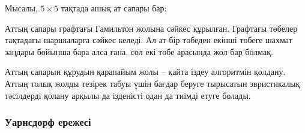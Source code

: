 Мысалы, $5 \times 5$ тақтада ашық ат сапары бар:

\begin{center}
\end{center}

Аттың сапары графтағы Гамильтон жолына сәйкес құрылған. Графтағы төбелер
тақтадағы шаршыларға сәйкес келеді. Ал ат бір төбеден екінші төбеге шахмат заңдары бойынша бара алса ғана, сол екі төбе арасында жол бар болмақ.

Аттың сапарын құрудын қарапайым жолы -- қайта іздеу алгоритмін қолдану.
Аттың толық жолды тезірек табуы үшін бағдар беруге тырысатын эвристикалық тәсілдерді қолану арқылы да ізденісті одан да тиімді етуге болады.


\subsubsection{Уарнсдорф ережесі}


